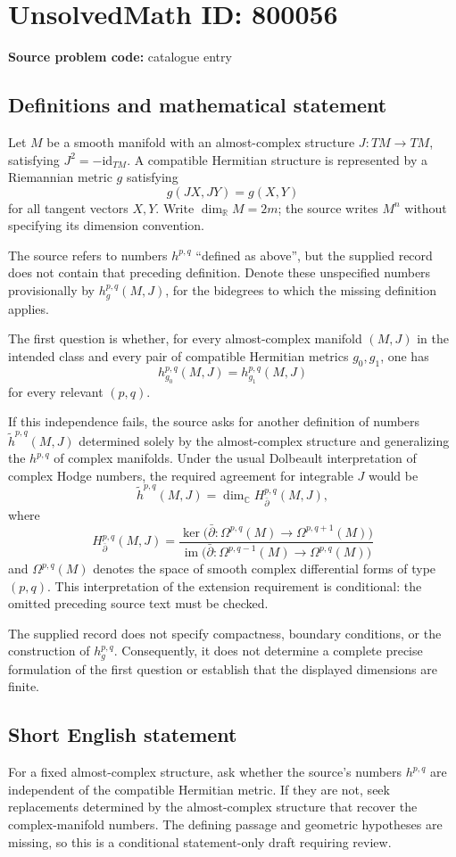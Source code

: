 \documentclass[11pt]{article}
\newcommand{\R}{\mathbb{R}}
\newcommand{\C}{\mathbb{C}}
\begin{document}
\section*{UnsolvedMath ID: 800056}
\textbf{Source problem code:} catalogue entry
\subsection{Definitions and mathematical statement}
Let \(M\) be a smooth manifold with an almost-complex structure \(J\colon TM\to TM\), satisfying \(J^2=-\mathrm{id}_{TM}\). A compatible Hermitian structure is represented by a Riemannian metric \(g\) satisfying
\[
g(JX,JY)=g(X,Y)
\]
for all tangent vectors \(X,Y\). Write \(\dim_{\R}M=2m\); the source writes \(M^n\) without specifying its dimension convention.

The source refers to numbers \(h^{p,q}\) ``defined as above'', but the supplied record does not contain that preceding definition. Denote these unspecified numbers provisionally by \(h^{p,q}_g(M,J)\), for the bidegrees to which the missing definition applies.

The first question is whether, for every almost-complex manifold \((M,J)\) in the intended class and every pair of compatible Hermitian metrics \(g_0,g_1\), one has
\[
h^{p,q}_{g_0}(M,J)=h^{p,q}_{g_1}(M,J)
\]
for every relevant \((p,q)\).

If this independence fails, the source asks for another definition of numbers \(\widetilde h^{p,q}(M,J)\) determined solely by the almost-complex structure and generalizing the \(h^{p,q}\) of complex manifolds. Under the usual Dolbeault interpretation of complex Hodge numbers, the required agreement for integrable \(J\) would be
\[
\widetilde h^{p,q}(M,J)=\dim_{\C}H^{p,q}_{\bar\partial}(M,J),
\]
where
\[
H^{p,q}_{\bar\partial}(M,J)=
\frac{\ker\bigl(\bar\partial\colon\Omega^{p,q}(M)\to\Omega^{p,q+1}(M)\bigr)}
{\operatorname{im}\bigl(\bar\partial\colon\Omega^{p,q-1}(M)\to\Omega^{p,q}(M)\bigr)}
\]
and \(\Omega^{p,q}(M)\) denotes the space of smooth complex differential forms of type \((p,q)\). This interpretation of the extension requirement is conditional: the omitted preceding source text must be checked.

The supplied record does not specify compactness, boundary conditions, or the construction of \(h^{p,q}_g\). Consequently, it does not determine a complete precise formulation of the first question or establish that the displayed dimensions are finite.
\subsection{Short English statement}
For a fixed almost-complex structure, ask whether the source's numbers \(h^{p,q}\) are independent of the compatible Hermitian metric. If they are not, seek replacements determined by the almost-complex structure that recover the complex-manifold numbers. The defining passage and geometric hypotheses are missing, so this is a conditional statement-only draft requiring review.
\end{document}
